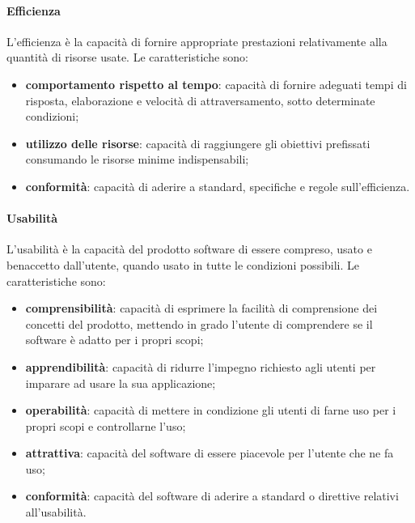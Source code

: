 \paragraph{Efficienza}
L'efficienza è la capacità di fornire appropriate prestazioni relativamente alla quantità di risorse usate. Le caratteristiche sono:
\begin{itemize}
\item \textbf{comportamento rispetto al tempo}: capacità di fornire adeguati tempi di risposta, elaborazione e velocità di attraversamento, sotto determinate condizioni;
\item \textbf{utilizzo delle risorse}: capacità di raggiungere gli obiettivi prefissati consumando le risorse minime indispensabili;
\item \textbf{conformità}: capacità di aderire a standard, specifiche e regole sull'efficienza.
\end{itemize}

\paragraph{Usabilità}
L'usabilità è la capacità del prodotto software di essere compreso, usato e benaccetto dall'utente, quando usato in tutte le condizioni possibili. Le caratteristiche sono:
\begin{itemize}
\item \textbf{comprensibilità}: capacità di esprimere la facilità di comprensione dei concetti del prodotto, mettendo in grado l'utente di comprendere se il software è adatto per i propri scopi;
\item \textbf{apprendibilità}: capacità di ridurre l'impegno richiesto agli utenti per imparare ad usare la sua applicazione;
\item \textbf{operabilità}: capacità di mettere in condizione gli utenti di farne uso per i propri scopi e controllarne l'uso;
\item \textbf{attrattiva}: capacità del software di essere piacevole per l'utente che ne fa uso;
\item \textbf{conformità}: capacità del software di aderire a standard o direttive relativi all'usabilità.
\end{itemize}

